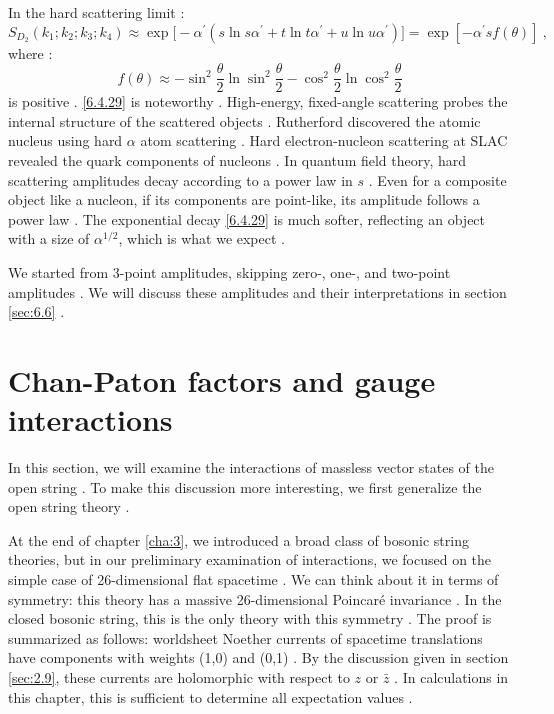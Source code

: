 In the hard scattering limit :
\begin{equation}
	S_{D_{2}}(k_{1} ; k_{2} ; k_{3} ; k_{4}) \approx \exp \bigl[-\alpha^{\prime}(s \ln s \alpha^{\prime}+t \ln t \alpha^{\prime}+u \ln u \alpha^{\prime})\bigr]=\exp [-\alpha^{\prime} s f(\theta)] \:, \label{6.4.29}
\end{equation}
where :
\begin{equation}
	f(\theta) \approx-\sin ^{2} \frac{\theta}{2} \ln \sin ^{2} \frac{\theta}{2}-\cos ^{2} \frac{\theta}{2} \ln \cos ^{2} \frac{\theta}{2}
	\label{6.4.30}
\end{equation}
is positive . \eqref{6.4.29} is noteworthy . High-energy, fixed-angle scattering probes the internal structure of the scattered objects . Rutherford discovered the atomic nucleus using hard $\alpha$ atom scattering . Hard electron-nucleon scattering at SLAC revealed the quark components of nucleons . In quantum field theory, hard scattering amplitudes decay according to a power law in $s$ . Even for a composite object like a nucleon, if its components are point-like, its amplitude follows a power law . The exponential decay \eqref{6.4.29} is much softer, reflecting an object with a size of $\alpha^{1 / 2}$, which is what we expect .

We started from 3-point amplitudes, skipping zero-, one-, and two-point amplitudes . We will discuss these amplitudes and their interpretations in section \ref{sec:6.6} .

\section{Chan-Paton factors and gauge interactions} \label{sec:6.5}

In this section, we will examine the interactions of massless vector states of the open string . To make this discussion more interesting, we first generalize the open string theory .

At the end of chapter \ref{cha:3}, we introduced a broad class of bosonic string theories, but in our preliminary examination of interactions, we focused on the simple case of 26-dimensional flat spacetime . We can think about it in terms of symmetry: this theory has a massive 26-dimensional Poincaré invariance . In the closed bosonic string, this is the only theory with this symmetry . The proof is summarized as follows: worldsheet Noether currents of spacetime translations have components with weights (1,0) and (0,1) . By the discussion given in section \ref{sec:2.9}, these currents are holomorphic with respect to $z$ or $\bar{z}$ . In calculations in this chapter, this is sufficient to determine all expectation values .

